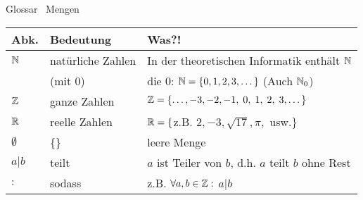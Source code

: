 %
%
%
%
\begin{frame}[fragile]{Glossar \textemdash\ Mengen}
    \small
    \begin{tabular}{p{} p{} p{}}
        \toprule
        Abk.        & Bedeutung         & Was?!                                                       \\
        \midrule
        $\mathbb{N}$ & natürliche Zahlen & In der theoretischen Informatik enthält $\mathbb{N}$         \\
                    & (mit $0$)         & die $0$: $\mathbb{N}=\{0,1,2,3,\dots\}$ (Auch $\mathbb{N}_0$) \\
        $\mathbb{Z}$ & ganze Zahlen      & $\mathbb{Z}=\{\dots,-3,-2,-1,\;0,\;1,\;2,\;3,\dots\}$        \\
        $\mathbb{R}$    & reelle Zahlen     & $\mathbb{R}=\{$z.B. $ 2,-3,\sqrt{17},\pi,$ usw.$\}$             \\
        $\emptyset$ & \{\}              & leere Menge                                                 \\
        $a|b$       & teilt             & $a$ ist Teiler von $b$, d.h. $a$ teilt $b$ ohne Rest        \\
        $:$         & sodass            & z.B. $\forall a,b\in\mathbb{Z}:$ $a|b$                       \\
        \bottomrule
    \end{tabular}
\end{frame}

